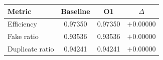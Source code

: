 \renewcommand{\arraystretch}{1.4}
\begin{tabular}{lccc}
\toprule
Metric & Baseline & O1 & $\Delta$ \\
\midrule
Efficiency & 0.97350 & 0.97350 & $+0.00000$ \\
\rowcolor{gray!15}
Fake ratio & 0.93536 & 0.93536 & $+0.00000$ \\
Duplicate ratio & 0.94241 & 0.94241 & $+0.00000$ \\
\bottomrule
\end{tabular}
